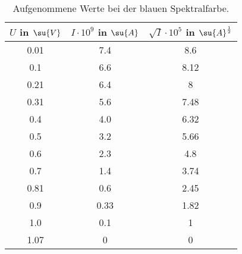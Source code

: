 \begin{table}
  \centering
  \label{tab:Gelb_Komplett}
  \caption{Aufgenommene Werte bei der blauen Spektralfarbe.}
  \begin{tabular}{c c c}
    \toprule
    $U$ in $\su{V}$ & $I\cdot 10^{9}$ in $\su{A}$ & $\sqrt{I}\cdot10^{5}$ in $\su{A}^{\frac{1}{2}}$ \\
    \midrule
    0.01 & 7.4  & 8.6  \\
    0.1  & 6.6  & 8.12 \\
    0.21 & 6.4  & 8    \\
    0.31 & 5.6  & 7.48 \\
    0.4  & 4.0  & 6.32 \\
    0.5  & 3.2  & 5.66 \\
    0.6  & 2.3  & 4.8  \\
    0.7  & 1.4  & 3.74 \\
    0.81 & 0.6  & 2.45 \\
    0.9  & 0.33 & 1.82 \\
    1.0  & 0.1  & 1    \\
    1.07 & 0    & 0    \\
    \bottomrule
  \end{tabular}
\end{table}
